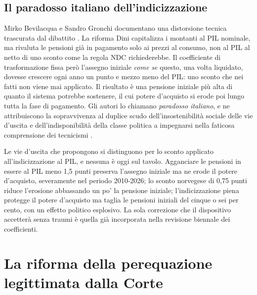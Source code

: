 \subsection{Il paradosso italiano dell'indicizzazione}
\label{sub:indicizzazione}

\noindent
Mirko Bevilacqua e Sandro Gronchi documentano una distorsione tecnica trascurata
dal dibattito \cite{BevilacquaGronchi2025}. La riforma Dini capitalizza i montanti
al PIL nominale, ma rivaluta le pensioni già in pagamento solo ai prezzi al
consumo, non al PIL al netto di uno sconto come la regola NDC richiederebbe. Il
coefficiente di trasformazione fissa però l'assegno iniziale \emph{come se} questo,
una volta liquidato, dovesse crescere ogni anno un punto e mezzo meno del PIL: uno
sconto che nei fatti non viene mai applicato. Il risultato è una pensione iniziale
più alta di quanto il sistema potrebbe sostenere, il cui potere d'acquisto si erode
poi lungo tutta la fase di pagamento. Gli autori lo chiamano \emph{paradosso
italiano}, e ne attribuiscono la sopravvivenza al \guillemotleft{}duplice scudo
dell'insostenibilità sociale delle vie d'uscita e dell'indisponibilità della classe
politica a impegnarsi nella faticosa comprensione dei tecnicismi
\guillemotright{}\cite{BevilacquaGronchi2025}.

\medskip
\noindent
Le vie d'uscita che propongono si distinguono per lo sconto applicato
all'indicizzazione al PIL, e nessuna è oggi sul tavolo. Agganciare le pensioni in
essere al PIL meno 1,5 punti preserva l'assegno iniziale ma ne erode il potere
d'acquisto, severamente nel periodo 2010-2026; lo sconto norvegese di 0,75 punti
riduce l'erosione abbassando un po' la pensione iniziale; l'indicizzazione piena
protegge il potere d'acquisto ma taglia le pensioni iniziali del cinque o sei per
cento, con un effetto politico esplosivo. La sola correzione che il dispositivo
accetterà senza traumi è quella già incorporata nella revisione biennale dei
coefficienti.

\section{La riforma della perequazione legittimata dalla Corte}
\label{sec:perequazione}


